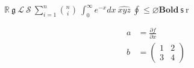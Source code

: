 \documentclass[dvisvgm]{standalone}
\begin{document}
$\displaystyle \mathbb{R}\ \mathfrak{g}\ \mathcal{L}\ \mathscr{S}\ \sum_{i=1}^n \binom{n}{i}\ \int_0^\infty e^{-x}dx\ \widehat{xyz}\ \oint \leqslant \varnothing \mathbf{Bold}\ \mathsf{s}\ \mathrm{r}$

\begin{minipage}{8cm}
\begin{align} a &= \frac{\partial f}{\partial x} \\ b &= \begin{pmatrix}1&2\\3&4\end{pmatrix} \end{align}
\end{minipage}
\end{document}

